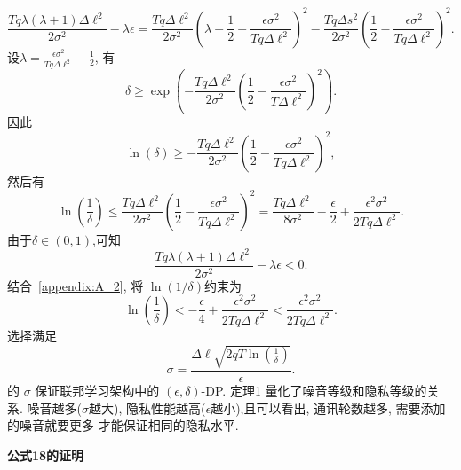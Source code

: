 \begin{equation}
\frac{Tq\lambda(\lambda+1)\Delta\ell^2}{2\sigma^2}-\lambda\epsilon=\frac{Tq\Delta\ell^{2}}{2\sigma^2}\left(\lambda+\frac{1}{2}-\frac{\epsilon\sigma^2}{Tq\Delta\ell^2}\right)^2-\frac{Tq\Delta s^{2}}{2\sigma^2}\left(\frac{1}{2}-\frac{\epsilon\sigma^2}{Tq\Delta\ell^2}\right)^2.
\end{equation}
设$\lambda = \frac{\epsilon\sigma^2}{Tq\Delta\ell^2}-\frac{1}{2}$, 有
\begin{equation}
\delta \geq\exp\left(-\frac{Tq\Delta\ell^{2}}{2\sigma^2}\left(\frac{1}{2}-\frac{\epsilon\sigma^2}{T\Delta\ell^2}\right)^2\right).
\end{equation}
因此
\begin{equation}
\ln(\delta)\geq-\frac{Tq\Delta\ell^{2}}{2\sigma^2}\left(\frac{1}{2}-\frac{\epsilon\sigma^2}{Tq\Delta\ell^2}\right)^2,
\end{equation}
然后有
\begin{equation}
\ln\left(\frac{1}{\delta}\right)\leq\frac{Tq\Delta\ell^{2}}{2\sigma^2}\left(\frac{1}{2}-\frac{\epsilon\sigma^2}{Tq\Delta\ell^2}\right)^2
=\frac{Tq\Delta\ell^{2}}{8\sigma^2}-\frac{\epsilon}{2}+\frac{\epsilon^2 \sigma^2}{2Tq\Delta\ell^{2}}.
\end{equation}
由于$\delta \in (0,1)$,可知  
\begin{equation}\label{appendix:A_2}
\frac{Tq\lambda(\lambda+1)\Delta\ell^2}{2\sigma^2}-\lambda\epsilon<0.
\end{equation}
结合~\eqref{appendix:A_2}, 将 $\ln\left(1/\delta\right)$约束为
\begin{equation}
\ln\left(\frac{1}{\delta}\right)<-\frac{\epsilon}{4}+\frac{\epsilon^2 \sigma^2}{2Tq\Delta\ell^{2}}<\frac{\epsilon^2 \sigma^2}{2Tq\Delta \ell^{2}}.
\end{equation}
选择满足
\begin{equation}\label{Appendix_C_1}
\sigma = \frac{\Delta \ell\sqrt{2qT\ln\left(\frac{1}{\delta}\right)}}{\epsilon}.
\end{equation} 的 $\sigma$ 保证联邦学习架构中的 $(\epsilon, \delta)$-DP. 
定理1 量化了噪音等级和隐私等级的关系. 噪音越多($\sigma$越大), 隐私性能越高($\epsilon$越小),且可以看出, 通讯轮数越多, 需要添加的噪音就要更多 才能保证相同的隐私水平.

\textbf{公式18的证明}

